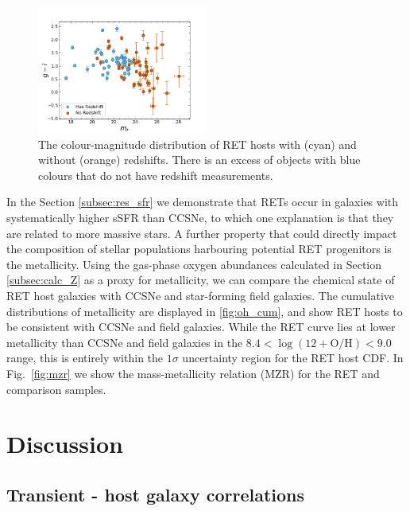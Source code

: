 \documentclass[fleqn,usenatbib,]{mnras}
\begin{document}
\begin{figure}
\includegraphics[width=0.5\textwidth]{figs/mag_v_colour.png}
\caption{The colour-magnitude distribution of RET hosts with (cyan) and without (orange) redshifts. There is an excess of objects with blue colours that do not have redshift measurements.
\label{fig:g-i}}
\end{figure}

In the Section \ref{subsec:res_sfr} we demonstrate that RETs occur in galaxies with systematically higher sSFR than CCSNe, to which one explanation is that they are related to more massive stars. A further property that could directly impact the composition of stellar populations harbouring potential RET progenitors is the metallicity. Using the gas-phase oxygen abundances calculated in Section \ref{subsec:calc_Z} as a proxy for metallicity, we can compare the chemical state of RET host galaxies with CCSNe and star-forming field galaxies. The cumulative distributions of metallicity are displayed in \ref{fig:oh_cum}, and show RET hosts to be consistent with CCSNe and field galaxies. While the RET curve lies at lower metallicity than CCSNe and field galaxies in the $8.4 < \log \left(12+\textrm{O/H}\right)<9.0$ range, this is entirely within the $1\sigma$ uncertainty region for the RET host CDF. In Fig.~\ref{fig:mzr} we show the mass-metallicity relation (MZR) for the RET and comparison samples.



\section{Discussion \label{sec:disc}}

\subsection{Transient - host galaxy correlations}
\end{document}
